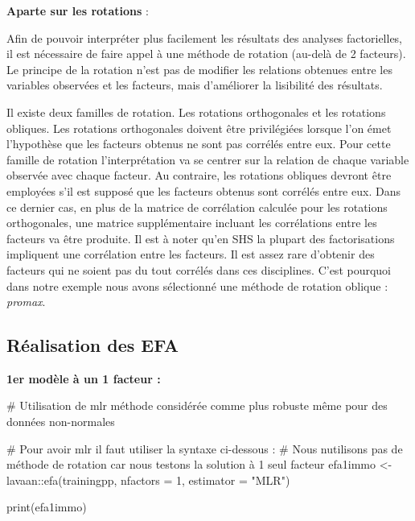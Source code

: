 \documentclass[
  french,
  11pt,
  a4paper,
]{article}
\newenvironment{Shaded}{}{}
\newcommand{\AttributeTok}[1]{\textcolor[rgb]{0.84,0.23,0.29}{#1}}
\newcommand{\CommentTok}[1]{\textcolor[rgb]{0.42,0.45,0.49}{#1}}
\newcommand{\DecValTok}[1]{\textcolor[rgb]{0.00,0.36,0.77}{#1}}
\newcommand{\FunctionTok}[1]{\textcolor[rgb]{0.44,0.26,0.76}{#1}}
\newcommand{\NormalTok}[1]{\textcolor[rgb]{0.14,0.16,0.18}{#1}}
\newcommand{\OtherTok}[1]{\textcolor[rgb]{0.44,0.26,0.76}{#1}}
\newcommand{\SpecialCharTok}[1]{\textcolor[rgb]{0.00,0.36,0.77}{#1}}
\newcommand{\StringTok}[1]{\textcolor[rgb]{0.01,0.18,0.38}{#1}}
\begin{document}
\begin{tcolorbox}[enhanced jigsaw, arc=.35mm, bottomrule=.15mm, bottomtitle=1mm, breakable, colback=white, colbacktitle=quarto-callout-note-color!10!white, colframe=quarto-callout-note-color-frame, coltitle=black, left=2mm, leftrule=.75mm, opacityback=0, opacitybacktitle=0.6, rightrule=.15mm, title=\textcolor{quarto-callout-note-color}{\faInfo}\hspace{0.5em}{Note}, titlerule=0mm, toprule=.15mm, toptitle=1mm]

\textbf{Aparte sur les rotations} :

Afin de pouvoir interpréter plus facilement les résultats des analyses
factorielles, il est nécessaire de faire appel à une méthode de rotation
(au-delà de 2 facteurs). Le principe de la rotation n'est pas de
modifier les relations obtenues entre les variables observées et les
facteurs, mais d'améliorer la lisibilité des résultats.

Il existe deux familles de rotation. Les rotations orthogonales et les
rotations obliques. Les rotations orthogonales doivent être privilégiées
lorsque l'on émet l'hypothèse que les facteurs obtenus ne sont pas
corrélés entre eux. Pour cette famille de rotation l'interprétation va
se centrer sur la relation de chaque variable observée avec chaque
facteur. Au contraire, les rotations obliques devront être employées
s'il est supposé que les facteurs obtenus sont corrélés entre eux. Dans
ce dernier cas, en plus de la matrice de corrélation calculée pour les
rotations orthogonales, une matrice supplémentaire incluant les
corrélations entre les facteurs va être produite. Il est à noter qu'en
SHS la plupart des factorisations impliquent une corrélation entre les
facteurs. Il est assez rare d'obtenir des facteurs qui ne soient pas du
tout corrélés dans ces disciplines. C'est pourquoi dans notre exemple
nous avons sélectionné une méthode de rotation oblique : \emph{promax}.

\end{tcolorbox}

\subsection{Réalisation des EFA}\label{ruxe9alisation-des-efa}

\textbf{1er modèle à un 1 facteur :}

\begin{Shaded}
\begin{Highlighting}[]
\CommentTok{\# Utilisation de mlr méthode considérée comme plus robuste même pour des données non{-}normales}

\CommentTok{\# Pour avoir mlr il faut utiliser la syntaxe ci{-}dessous :}
\CommentTok{\# Nous n\textquotesingle{}utilisons pas de méthode de rotation car nous testons la solution à 1 seul facteur}
\NormalTok{efa1immo }\OtherTok{\textless{}{-}}\NormalTok{ lavaan}\SpecialCharTok{::}\FunctionTok{efa}\NormalTok{(trainingpp, }\AttributeTok{nfactors =} \DecValTok{1}\NormalTok{, }\AttributeTok{estimator =} \StringTok{"MLR"}\NormalTok{)}

\FunctionTok{print}\NormalTok{(efa1immo)}
\end{Highlighting}
\end{Shaded}
\end{document}
